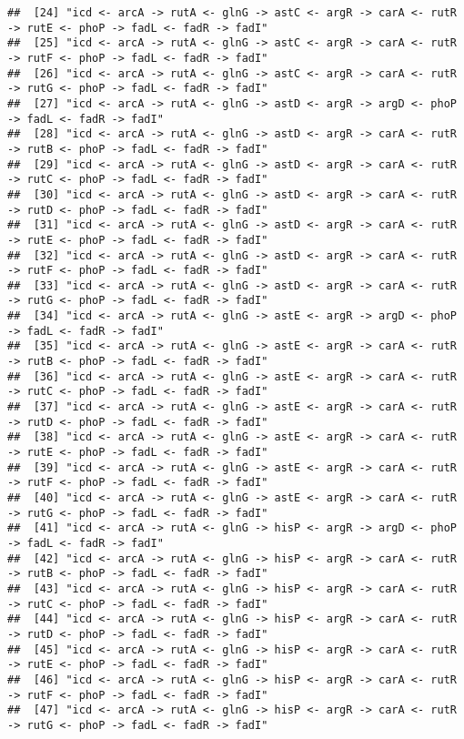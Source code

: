 \documentclass[
]{article}
\begin{document}
\begin{verbatim}
##  [24] "icd <- arcA -> rutA <- glnG -> astC <- argR -> carA <- rutR -> rutE <- phoP -> fadL <- fadR -> fadI"
##  [25] "icd <- arcA -> rutA <- glnG -> astC <- argR -> carA <- rutR -> rutF <- phoP -> fadL <- fadR -> fadI"
##  [26] "icd <- arcA -> rutA <- glnG -> astC <- argR -> carA <- rutR -> rutG <- phoP -> fadL <- fadR -> fadI"
##  [27] "icd <- arcA -> rutA <- glnG -> astD <- argR -> argD <- phoP -> fadL <- fadR -> fadI"                
##  [28] "icd <- arcA -> rutA <- glnG -> astD <- argR -> carA <- rutR -> rutB <- phoP -> fadL <- fadR -> fadI"
##  [29] "icd <- arcA -> rutA <- glnG -> astD <- argR -> carA <- rutR -> rutC <- phoP -> fadL <- fadR -> fadI"
##  [30] "icd <- arcA -> rutA <- glnG -> astD <- argR -> carA <- rutR -> rutD <- phoP -> fadL <- fadR -> fadI"
##  [31] "icd <- arcA -> rutA <- glnG -> astD <- argR -> carA <- rutR -> rutE <- phoP -> fadL <- fadR -> fadI"
##  [32] "icd <- arcA -> rutA <- glnG -> astD <- argR -> carA <- rutR -> rutF <- phoP -> fadL <- fadR -> fadI"
##  [33] "icd <- arcA -> rutA <- glnG -> astD <- argR -> carA <- rutR -> rutG <- phoP -> fadL <- fadR -> fadI"
##  [34] "icd <- arcA -> rutA <- glnG -> astE <- argR -> argD <- phoP -> fadL <- fadR -> fadI"                
##  [35] "icd <- arcA -> rutA <- glnG -> astE <- argR -> carA <- rutR -> rutB <- phoP -> fadL <- fadR -> fadI"
##  [36] "icd <- arcA -> rutA <- glnG -> astE <- argR -> carA <- rutR -> rutC <- phoP -> fadL <- fadR -> fadI"
##  [37] "icd <- arcA -> rutA <- glnG -> astE <- argR -> carA <- rutR -> rutD <- phoP -> fadL <- fadR -> fadI"
##  [38] "icd <- arcA -> rutA <- glnG -> astE <- argR -> carA <- rutR -> rutE <- phoP -> fadL <- fadR -> fadI"
##  [39] "icd <- arcA -> rutA <- glnG -> astE <- argR -> carA <- rutR -> rutF <- phoP -> fadL <- fadR -> fadI"
##  [40] "icd <- arcA -> rutA <- glnG -> astE <- argR -> carA <- rutR -> rutG <- phoP -> fadL <- fadR -> fadI"
##  [41] "icd <- arcA -> rutA <- glnG -> hisP <- argR -> argD <- phoP -> fadL <- fadR -> fadI"                
##  [42] "icd <- arcA -> rutA <- glnG -> hisP <- argR -> carA <- rutR -> rutB <- phoP -> fadL <- fadR -> fadI"
##  [43] "icd <- arcA -> rutA <- glnG -> hisP <- argR -> carA <- rutR -> rutC <- phoP -> fadL <- fadR -> fadI"
##  [44] "icd <- arcA -> rutA <- glnG -> hisP <- argR -> carA <- rutR -> rutD <- phoP -> fadL <- fadR -> fadI"
##  [45] "icd <- arcA -> rutA <- glnG -> hisP <- argR -> carA <- rutR -> rutE <- phoP -> fadL <- fadR -> fadI"
##  [46] "icd <- arcA -> rutA <- glnG -> hisP <- argR -> carA <- rutR -> rutF <- phoP -> fadL <- fadR -> fadI"
##  [47] "icd <- arcA -> rutA <- glnG -> hisP <- argR -> carA <- rutR -> rutG <- phoP -> fadL <- fadR -> fadI"

\end{verbatim}
\end{document}
